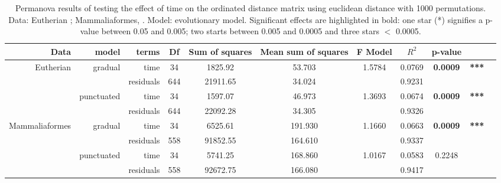 \documentclass[12pt,letterpaper]{article}
\begin{document}
\begin{landscape}
\begin{table}[ht]
\caption{Permanova results of testing the effect of time on the ordinated distance matrix using euclidean distance with 1000 permutations. Data: Eutherian \citep[data from][]{beckancient2014}; Mammaliaformes, \citep[data from][]{Slater2012MEE}. Model: evolutionary model. Significant effects are highlighted in bold: one star (*) signifies a p-value between 0.05 and 0.005; two starts between 0.005 and 0.0005 and three stars $<$ 0.0005.} %
\label{tab:Tab_permanova}
\centering
\begin{tabular}{rrrcccccccc}
  \hline
 Data & model & terms & Df & Sum of squares & Mean sum of squares & F Model & $R^2$ & p-value & \\ 
  \hline
Eutherian     & gradual    & time      & 34  & 1825.92  & 53.703  & 1.5784 & 0.0769 & \textbf{0.0009}& \textbf{***} \\ 
              &            & residuals & 644 & 21911.65 & 34.024  &        & 0.9231 &  &\\ 
              & punctuated & time      & 34  & 1597.07  & 46.973  & 1.3693 & 0.0674 & \textbf{0.0009}& \textbf{***} \\ 
              &            & residuals & 644 & 22092.28 & 34.305  &        & 0.9326 &  &\\ 
Mammaliaformes & gradual    & time      & 34  & 6525.61  & 191.930 & 1.1660 & 0.0663 & \textbf{0.0009}& \textbf{***} \\ 
              &            & residuals & 558 & 91852.55 & 164.610 &        & 0.9337 &  &\\ 
              & punctuated & time      & 34  & 5741.25  & 168.860 & 1.0167 & 0.0583 & 0.2248 &\\ 
              &            & residuals & 558 & 92672.75 & 166.080 &        & 0.9417 &  &\\ 
   \hline
\end{tabular}
\end{table}
\end{landscape}
\end{document}
